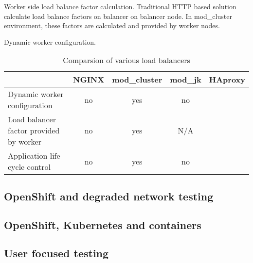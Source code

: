 \documentclass[
  master,
  biblatex,
  glossaries,
  index
]{kidiplom}
\begin{document}
Worker side load balance factor calculation. Traditional HTTP based solution calculate load balance factors on balancer on balancer node. In mod\_cluster environment, these factors are calculated and provided by worker nodes.\cite{bib:modcluster}

Dynamic worker configuration. %

\begin{table}[]
\centering
\caption{Comparsion of various load balancers}
\label{my-label}
\begin{tabularx}{\linewidth}{X|cccc}
                                        & NGINX                             & mod\_cluster              & mod\_jk          & HAproxy \\ \hline
Dynamic worker configuration            & no\cite{bib:nginxlb}              & yes\cite{bib:modcluster}  & no               &         \\
Load balancer factor provided by worker & no\cite{bib:nginxlb}              & yes\cite{bib:modcluster}  & N/A\footnotemark &         \\
Application life cycle control          & no\footnotemark\cite{bib:nginxlb} & yes\cite{bib:modcluster}  & no               &
\end{tabularx}
\end{table}


\subsection{OpenShift and degraded network testing}


\subsection{OpenShift, Kubernetes and containers}


\subsection{User focused testing}
\end{document}
